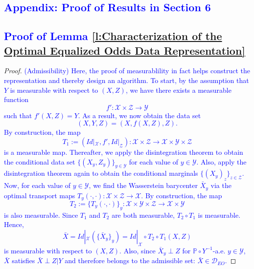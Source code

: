 \documentclass[twoside,11pt]{article}
\newcommand{\edit}[1]{\textcolor{blue}{#1}}
\begin{document}


\edit{\section{Appendix: Proof of Results in Section 6} \label{A:Section 6 Appendix}}

\subsection{\edit{Proof of Lemma \ref{l:Characterization of the Optimal Equalized Odds Data Representation}}}

\begin{proof} 
\edit{(Admissibility) Here, the proof of measurablility in fact helps construct the representation and thereby design an algorithm. To start, by the assumption that $Y$ is measurable with respect to $(X,Z)$, we have there exists a measurable function $$f' : \mathcal{X} \times \mathcal{Z} \rightarrow \mathcal{Y}$$ such that $f'(X,Z) = Y$. As a result, we now obtain the data set $$(X,Y,Z) = (X,f(X,Z),Z).$$ By construction, the map $$T_1 := (Id|_{\mathcal{X}}, f', Id|_{\mathcal{Z}}) : \mathcal{X} \times \mathcal{Z} \rightarrow \mathcal{X} \times \mathcal{Y} \times \mathcal{Z}$$ is a measurable map. Thereafter, we apply the disintegration theorem to obtain the conditional data set $\{(X_y,Z_y)\}_{y \in \mathcal{Y}}$ for each value of $y \in \mathcal{Y}$. Also, apply the disintegration theorem again to obtain the conditional marginals $\{(X_y)_z\}_{z \in \mathcal{Z}}$. Now, for each value of $y \in \mathcal{Y}$, we find the Wasserstein barycenter $\bar{X}_y$ via the optimal transport maps $T_y(\cdot,\cdot): \mathcal{X} \times \mathcal{Z} \rightarrow \mathcal{X}$. By construction, the map $$T_2 := \{T_y(\cdot,\cdot)\}_y : \mathcal{X} \times \mathcal{Y} \times \mathcal{Z} \rightarrow \mathcal{X} \times \mathcal{Y}$$ is also measurable. Since $T_1$ and $T_2$ are both measurable,  $T_2 \circ T_1$ is measurable. Hence, $$\bar{X} = Id|_{\mathcal{X}}(\{\bar{X}_y\}_y) =  Id|_{\mathcal{X}} \circ T_2 \circ T_1(X,Z)$$ is measurable with respect to $(X,Z)$. Also, since $\bar{X}_y \perp Z$ for $\mathbb{P} \circ Y^{-1}$-a.e. $y \in \mathcal{Y}$, $\bar{X}$ satisfies $\bar{X} \perp Z | Y$ and therefore belongs to the admissible set: $\bar{X} \in \mathcal{D}_{EO}$.}


\end{proof}
\end{document}

